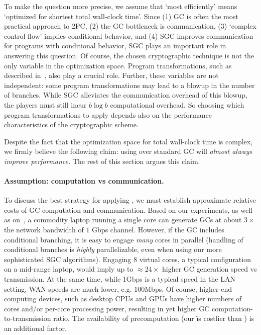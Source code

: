 To make the question more precise, we assume that `most efficiently' means
`optimized for shortest total wall-clock time'.
Since
(1) GC is often the most practical approach to 2PC,
(2) the GC bottleneck is communication,
(3) `complex control flow' implies conditional behavior, and
(4) SGC improves communication for programs with conditional behavior,
SGC plays an important role in answering this question.
%
Of course, the chosen cryptographic technique is not the only variable
in the optimization space.
Program transformations, such as described
in~, also play a crucial role.
%
Further, these variables are not independent:
some program transformations may lead to a blowup in the number of
branches.
While SGC alleviates the communication overhead of this blowup, the
players must still incur $b \log b$ computational overhead.
%
So choosing which program transformations to apply depends also on the
performance characteristics of the cryptographic scheme.

Despite the fact that the optimization space for total wall-clock time
is complex, we firmly believe the following claim:
using \ourschemelong over standard GC will \emph{almost always improve
  performance.}
The rest of this section argues this claim.

\paragraph{Assumption: computation vs communication.} 
To discuss the best strategy for applying \ourscheme, we must establish
approximate relative costs of GC computation and communication.  Based
on our experiments, as well as on~\cite{XiaoPersonalComm}, a commodity
laptop running a single core can generate GCs at about $3\times$ the
network bandwidth of $1$ Gbps channel.
%
However, if the GC includes conditional branching, it is easy to
engage \emph{many} cores in parallel (handling of conditional branches
is \emph{highly} parallelizable, even when using our more
sophisticated SGC algorithms).
%
Engaging  $8$ virtual cores, a
typical configuration on a mid-range laptop, would imply up to
$\approx 24\times$ higher GC generation speed vs transmission.
%
At the same time, while 1Gbps is a typical speed in the LAN setting, WAN
speeds are much lower, e.g. 100Mbps.
%
Of course, higher-end computing devices, such as desktop CPUs and GPUs
have higher numbers of cores and/or per-core processing power,
resulting in yet higher GC computation-to-transmission ratio.
%
The availability of precomputation (our \G is costlier than \E) is an
additional factor.

